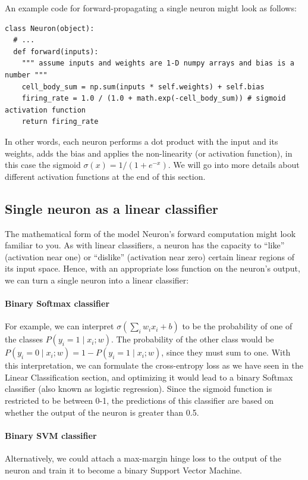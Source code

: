An example code for forward-propagating a single neuron might look as follows:


\begin{lstlisting}[frame=single]
class Neuron(object):
  # ... 
  def forward(inputs):
    """ assume inputs and weights are 1-D numpy arrays and bias is a number """
    cell_body_sum = np.sum(inputs * self.weights) + self.bias
    firing_rate = 1.0 / (1.0 + math.exp(-cell_body_sum)) # sigmoid activation function
    return firing_rate
\end{lstlisting}

In other words, each neuron performs a dot product with the input and its weights, adds the bias and applies the non-linearity (or activation function), in this case the sigmoid $\sigma(x)=1/(1+e^{−x})$. We will go into more details about different activation functions at the end of this section.

\subsection*{Single neuron as a linear classifier}

The mathematical form of the model Neuron’s forward computation might look familiar to you. As with linear classifiers, a neuron has the capacity to ``like” (activation near one) or ``dislike” (activation near zero) certain linear regions of its input space. Hence, with an appropriate loss function on the neuron’s output, we can turn a single neuron into a linear classifier:

\paragraph*{Binary Softmax classifier} For example, we can interpret $\sigma(\sum_iw_ix_i+b)$ to be the probability of one of the classes $P(y_i=1∣x_i;w)$. The probability of the other class would be $P(y_i=0∣x_i;w)=1−P(y_i=1∣x_i;w)$, since they must sum to one. With this interpretation, we can formulate the cross-entropy loss as we have seen in the Linear Classification section, and optimizing it would lead to a binary Softmax classifier (also known as logistic regression). Since the sigmoid function is restricted to be between 0-1, the predictions of this classifier are based on whether the output of the neuron is greater than 0.5.

\paragraph*{Binary SVM classifier} Alternatively, we could attach a max-margin hinge loss to the output of the neuron and train it to become a binary Support Vector Machine.

